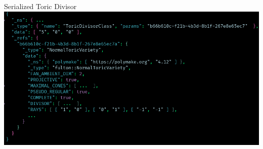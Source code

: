 \documentclass[9pt]{beamer}
\theoremstyle{definition}
\begin{document}
\begin{frame}[fragile]{ Serialized Toric Divisor}
  \includegraphics[width=\textwidth]{images/toric-divisor}
\end{frame}

\end{document}
